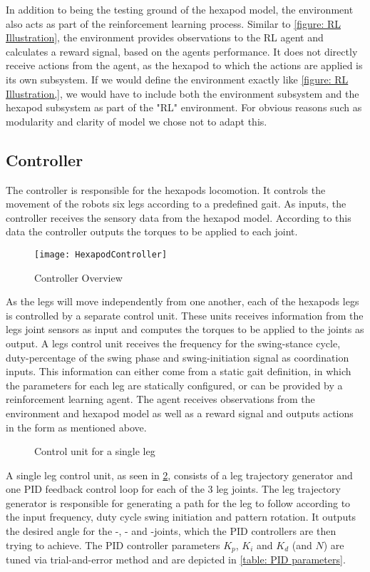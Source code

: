 In addition to being the testing ground of the hexapod model, the environment also acts as part of the reinforcement learning process.
Similar to \ref{figure: RL Illustration}, the environment provides observations to the RL agent and calculates a reward signal, based on the agents performance.
It does not directly receive actions from the agent, as the hexapod to which the actions are applied is its own subsystem.
If we would define the environment exactly like \ref{figure: RL Illustration,}, we would have to include both the environment subsystem and the hexapod subsystem as part of the "RL" environment.
For obvious reasons such as modularity and clarity of model we chose not to adapt this.

\subsection{Controller}
The controller is responsible for the hexapods locomotion.
It controls the movement of the robots six legs according to a predefined gait.
As inputs, the controller receives the sensory data from the hexapod model.
According to this data the controller outputs the torques to be applied to each joint.

\begin{figure}
	\centerline{\texttt{[image: HexapodController]}}
	\caption{Controller Overview}
	\label{figure: Controller Overview}
\end{figure}
As the legs will move independently from one another, each of the hexapods legs is controlled by a separate control unit.
These units receives information from the legs joint sensors as input and computes the torques to be applied to the joints as output.
A legs control unit receives the frequency for the swing-stance cycle, duty-percentage of the swing phase and swing-initiation signal as coordination inputs.
This information can either come from a static gait definition, in which the parameters for each leg are statically configured, or can be provided by a reinforcement learning agent.
The agent receives observations from the environment and hexapod model as well as a reward signal and outputs actions in the form as mentioned above.

\begin{figure}
	\centerline{}
	\caption{Control unit for a single leg}
	\label{figure: Leg control unit}
\end{figure}

A single leg control unit, as seen in \ref{figure: Leg control unit}, consists of a leg trajectory generator and one PID feedback control loop for each of the 3 leg joints.
The leg trajectory generator is responsible for generating a path for the leg to follow according to the input frequency, duty cycle swing initiation and pattern rotation.
It outputs the desired angle for the \textalpha-, \textbeta- and \textgamma-joints, which the PID controllers are then trying to achieve.
The PID controller parameters $K_p$, $K_i$ and $K_d$ (and $N$) are tuned via trial-and-error method and are depicted in \ref{table: PID parameters}.

